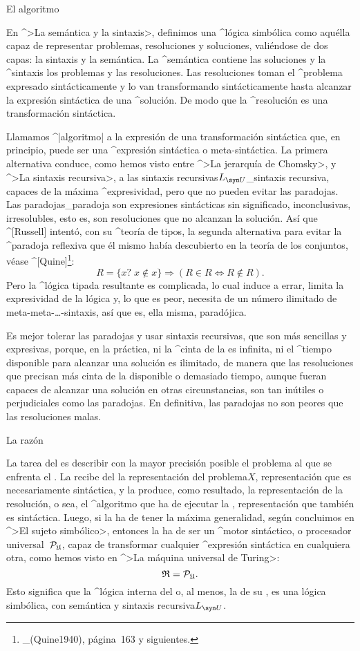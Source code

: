 \Section El algoritmo

En ^>La semántica y la sintaxis>, definimos una ^{lógica simbólica} como
aquélla capaz de representar problemas, resoluciones y soluciones,
valiéndose de dos capas: la sintaxis y la semántica. La ^{semántica}
contiene las soluciones y la ^{sintaxis} los problemas y las
resoluciones. Las resoluciones toman el ^{problema} expresado
sintácticamente y lo van transformando sintácticamente hasta alcanzar la
expresión sintáctica de una ^{solución}. De modo que la ^{resolución} es
una transformación sintáctica.

Llamamos ^|algoritmo| a la expresión de una transformación sintáctica
que, en principio, puede ser una ^{expresión sintáctica} o
meta-sintáctica. La primera alternativa conduce, como hemos visto entre
^>La jerarquía de Chomsky>, y ^>La sintaxis recursiva>, a las
\mental sintaxis recursivas$L_{\syn U}$_{sintaxis recursiva}, capaces de
la máxima ^{expresividad}, pero que no pueden evitar las paradojas. Las
paradojas_{paradoja} son expresiones sintácticas sin significado,
inconclusivas, irresolubles, esto es, son resoluciones que no alcanzan
la solución. Así que ^[Russell] intentó, con su ^{teoría de tipos}, la
segunda alternativa para evitar la ^{paradoja reflexiva} que él mismo
había descubierto en la teoría de los conjuntos, véase
^[Quine]\footnote{_(Quine1940), página~163 y siguientes.}:
 $$R = \{ x?\; x \not\in x\} \Longrightarrow
  ( R \in R \Longleftrightarrow R \not\in R ) .$$
Pero la ^{lógica tipada} resultante es complicada, lo cual induce a
errar, limita la expresividad de la lógica y, lo que es peor, necesita
de un número ilimitado de meta-meta-\dots-sintaxis, así que es, ella
misma, paradójica.

Es mejor tolerar las paradojas y usar sintaxis recursivas, que son más
sencillas y expresivas, porque, en la práctica, ni la ^{cinta} de la
{\TM} es infinita, ni el ^{tiempo} disponible para alcanzar una solución
es ilimitado, de manera que las resoluciones que precisan más cinta de
la disponible o demasiado tiempo, aunque fueran capaces de alcanzar una
solución en otras circunstancias, son tan inútiles o perjudiciales como
las paradojas. En definitiva, las paradojas no son peores que las
resoluciones malas.


\Section La razón

La tarea del {\inquisidor} es describir con la mayor precisión posible
el problema al que se enfrenta el {\sujeto}. La {\razon} recibe del
{\inquisidor} la representación del \Mental problema$X$, representación
que es necesariamente sintáctica, y la {\razon} produce, como resultado,
la representación de la resolución, o sea, el ^{algoritmo} que ha de
ejecutar la {\mente}, representación que también es sintáctica. Luego,
si la {\razon} ha de tener la máxima generalidad, según concluimos en
^>El sujeto simbólico>, entonces la {\razon} ha de ser un ^{motor
sintáctico}, o procesador universal~${\cal P}_{\frak U}$, capaz de
transformar cualquier ^{expresión sintáctica} en cualquiera otra, como
hemos visto en ^>La máquina universal de Turing>:
$${\frak R}={\cal P}_{\frak U} .$$
Esto significa que la ^{lógica interna} del {\sujeto} o, al menos, la de
su {\razon}, es una lógica simbólica, con semántica y \Mental sintaxis
recursiva$L_{\syn U}$.

